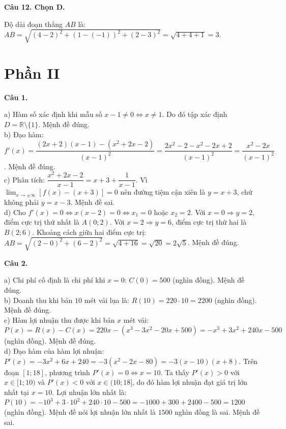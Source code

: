 \documentclass[12pt,a4paper]{article}
\newcommand{\loigiai}[1]{\par\medskip\Needspace{4\baselineskip}\noindent\textbf{#1}\par\nobreak}
\begin{document}
\loigiai{Câu 12. Chọn D.}
Độ dài đoạn thẳng $AB$ là:
$AB=\sqrt{(4-2)^2+(1-(-1))^2+(2-3)^2}=\sqrt{4+4+1}=3$.

\newpage
\section*{\large Phần II}
\loigiai{Câu 1.}
a) Hàm số xác định khi mẫu số $x-1\ne 0\Leftrightarrow x\ne 1$. Do đó tập xác định $D=\mathbb{R}\setminus\{1\}$. Mệnh đề đúng.\\
b) Đạo hàm:
$f'(x)=\dfrac{(2x+2)(x-1)-(x^2+2x-2)}{(x-1)^2}=\dfrac{2x^2-2-x^2-2x+2}{(x-1)^2}=\dfrac{x^2-2x}{(x-1)^2}$. Mệnh đề đúng.\\
c) Phân tích: $\dfrac{x^2+2x-2}{x-1}=x+3+\dfrac{1}{x-1}$.
Vì $\lim_{x\to\pm\infty}[f(x)-(x+3)]=0$ nên đường tiệm cận xiên là $y=x+3$, chứ không phải $y=x-3$. Mệnh đề sai.\\
d) Cho $f'(x)=0\Leftrightarrow x(x-2)=0\Leftrightarrow x_1=0$ hoặc $x_2=2$.
Với $x=0\Rightarrow y=2$, điểm cực trị thứ nhất là $A(0;2)$.
Với $x=2\Rightarrow y=6$, điểm cực trị thứ hai là $B(2;6)$.
Khoảng cách giữa hai điểm cực trị:
$AB=\sqrt{(2-0)^2+(6-2)^2}=\sqrt{4+16}=\sqrt{20}=2\sqrt{5}$. Mệnh đề đúng.

\loigiai{Câu 2.}
a) Chi phí cố định là chi phí khi $x=0$: $C(0)=500$ (nghìn đồng). Mệnh đề đúng.\\
b) Doanh thu khi bán $10$ mét vải lụa là: $R(10)=220\cdot 10=2200$ (nghìn đồng). Mệnh đề đúng.\\
c) Hàm lợi nhuận thu được khi bán $x$ mét vải:
$P(x)=R(x)-C(x)=220x-(x^3-3x^2-20x+500)=-x^3+3x^2+240x-500$ (nghìn đồng). Mệnh đề đúng.\\
d) Đạo hàm của hàm lợi nhuận:
$P'(x)=-3x^2+6x+240=-3(x^2-2x-80)=-3(x-10)(x+8)$.
Trên đoạn $[1;18]$, phương trình $P'(x)=0\Leftrightarrow x=10$.
Ta thấy $P'(x)>0$ với $x\in[1;10)$ và $P'(x)<0$ với $x\in(10;18]$, do đó hàm lợi nhuận đạt giá trị lớn nhất tại $x=10$.
Lợi nhuận lớn nhất là:
$P(10)=-10^3+3\cdot 10^2+240\cdot 10-500=-1000+300+2400-500=1200$ (nghìn đồng).
Mệnh đề nói lợi nhuận lớn nhất là $1500$ nghìn đồng là sai. Mệnh đề sai.
\end{document}
